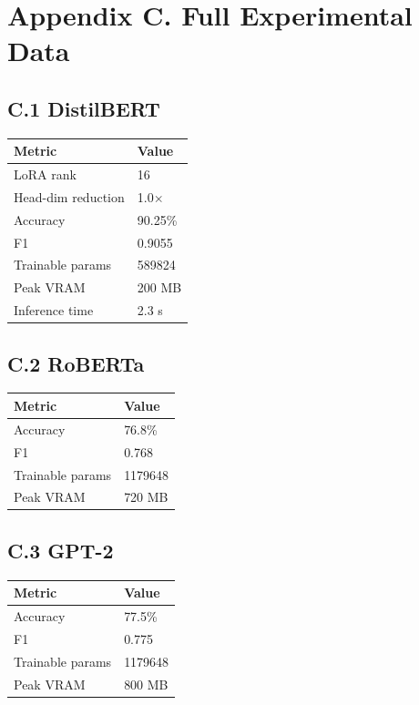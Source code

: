 
\section{Appendix C. Full Experimental Data}

\subsection{C.1 DistilBERT}

\begin{table}[H]
\centering
\small
\begin{tabular}{ll}
\toprule
\textbf{Metric} & \textbf{Value} \\
\midrule
LoRA rank & 16 \\
Head-dim reduction & 1.0$\times$ \\
Accuracy & 90.25\% \\
F1 & 0.9055 \\
Trainable params & 589824 \\
Peak VRAM & 200 MB \\
Inference time & 2.3 s \\
\bottomrule
\end{tabular}
\end{table}

\subsection{C.2 RoBERTa}

\begin{table}[H]
\centering
\small
\begin{tabular}{ll}
\toprule
\textbf{Metric} & \textbf{Value} \\
\midrule
Accuracy & 76.8\% \\
F1 & 0.768 \\
Trainable params & 1179648 \\
Peak VRAM & 720 MB \\
\bottomrule
\end{tabular}
\end{table}

\subsection{C.3 GPT-2}

\begin{table}[H]
\centering
\small
\begin{tabular}{ll}
\toprule
\textbf{Metric} & \textbf{Value} \\
\midrule
Accuracy & 77.5\% \\
F1 & 0.775 \\
Trainable params & 1179648 \\
Peak VRAM & 800 MB \\
\bottomrule
\end{tabular}
\end{table}

